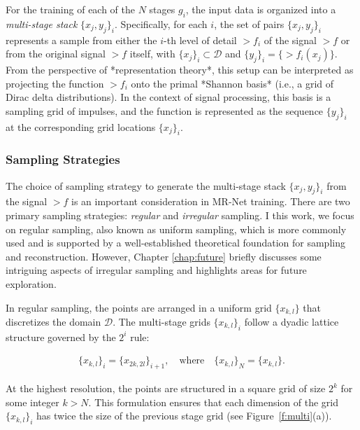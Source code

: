 For the training of each of the \( N \) stages \( g_i \), the input data is organized into a \textit{multi-stage stack} \(\{x_j, y_j\}_i\). Specifically, for each \( i \), the set of pairs \(\{x_j, y_j\}_i\) represents a sample from either the \( i \)-th level of detail \(\gt{f}_i\) of the signal \(\gt{f}\) or from the original signal \(\gt{f}\) itself, with \(\{x_j\}_i \subset \mathcal{D}\) and \(\{y_j\}_i = \{\gt{f}_i(x_j)\}\). From the perspective of *representation theory*, this setup can be interpreted as projecting the function \(\gt{f}_i\) onto the primal *Shannon basis* (i.e., a grid of Dirac delta distributions). In the context of signal processing, this basis is a sampling grid of impulses, and the function is represented as the sequence \(\{y_j\}_i\) at the corresponding grid locations \(\{x_j\}_i\).


\subsubsection{Sampling Strategies}

The choice of sampling strategy to generate the multi-stage stack \(\{x_j, y_j\}_i\) from the signal \(\gt{f}\) is an important consideration in MR-Net training. There are two primary sampling strategies: \textit{regular} and \textit{irregular} sampling. I this work, we focus on regular sampling, also known as uniform sampling, which is more commonly used and is supported by a well-established theoretical foundation for sampling and reconstruction. However, Chapter \ref{chap:future} briefly discusses some intriguing aspects of irregular sampling and highlights areas for future exploration.

In regular sampling, the points are arranged in a uniform grid \(\{x_{k,l}\}\) that discretizes the domain \(\mathcal{D}\). The multi-stage grids \(\{x_{k,l}\}_i\) follow a dyadic lattice structure governed by the \( 2^i \) rule:

\begin{align}
    \{x_{k,l}\}_i = \{x_{2k, 2l}\}_{i+1}, \quad \text{where} \quad \{x_{k,l}\}_N = \{x_{k,l}\}.
\end{align}

At the highest resolution, the points are structured in a square grid of size \( 2^k \) for some integer \( k > N \). This formulation ensures that each dimension of the grid \(\{x_{k,l}\}_i\) has twice the size of the previous stage grid (see Figure~\ref{f:multi}(a)).



